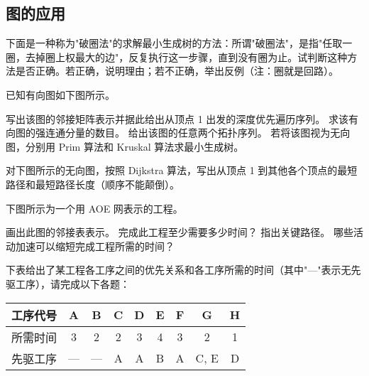 \subsection{图的应用}
\begin{qitems}
    \begin{bbox}
        \qitem 下面是一种称为"破圈法"的求解最小生成树的方法：所谓"破圈法"，是指"任取一圈，去掉圈上权最大的边"，反复执行这一步骤，直到没有圈为止。试判断这种方法是否正确。若正确，说明理由；若不正确，举出反例（注：圈就是回路）。
    \end{bbox}
    \begin{bbox}
        \qitem 已知有向图如下图所示。
        \begin{subqitems}
            \subqitem 写出该图的邻接矩阵表示并据此给出从顶点 1 出发的深度优先遍历序列。
            \subqitem 求该有向图的强连通分量的数目。
            \subqitem 给出该图的任意两个拓扑序列。
            \subqitem 若将该图视为无向图，分别用 Prim 算法和 Kruskal 算法求最小生成树。
        \end{subqitems}
    \end{bbox}
    \begin{bbox}
        \qitem 对下图所示的无向图，按照 Dijkstra 算法，写出从顶点 1 到其他各个顶点的最短路径和最短路径长度（顺序不能颠倒）。
    \end{bbox}
    \begin{bbox}
        \qitem 下图所示为一个用 AOE 网表示的工程。
        \begin{subqitems}
            \subqitem 画出此图的邻接表表示。
            \subqitem 完成此工程至少需要多少时间？
            \subqitem 指出关键路径。
            \subqitem 哪些活动加速可以缩短完成工程所需的时间？
        \end{subqitems}
    \end{bbox}
    \begin{bbox}
        \qitem 下表给出了某工程各工序之间的优先关系和各工序所需的时间（其中"—"表示无先驱工序），请完成以下各题：
        \begin{center}
        \begin{tabular}{|l|c|c|c|c|c|c|c|c|}
        \hline
        工序代号 & A & B & C & D & E & F & G & H \\
        \hline
        所需时间 & 3 & 2 & 2 & 3 & 4 & 3 & 2 & 1 \\
        \hline
        先驱工序 & --- & --- & A & A & B & A & C, E & D \\

\end{tabular}
\end{center}
\end{bbox}
\end{qitems}
